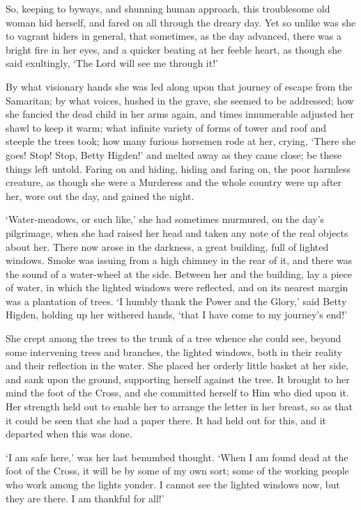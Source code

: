So, keeping to byways, and shunning human approach, this troublesome
old woman hid herself, and fared on all through the dreary day. Yet so
unlike was she to vagrant hiders in general, that sometimes, as the day
advanced, there was a bright fire in her eyes, and a quicker beating at
her feeble heart, as though she said exultingly, ‘The Lord will see me
through it!’

By what visionary hands she was led along upon that journey of escape
from the Samaritan; by what voices, hushed in the grave, she seemed
to be addressed; how she fancied the dead child in her arms again, and
times innumerable adjusted her shawl to keep it warm; what infinite
variety of forms of tower and roof and steeple the trees took; how many
furious horsemen rode at her, crying, ‘There she goes! Stop! Stop,
Betty Higden!’ and melted away as they came close; be these things left
untold. Faring on and hiding, hiding and faring on, the poor harmless
creature, as though she were a Murderess and the whole country were up
after her, wore out the day, and gained the night.

‘Water-meadows, or such like,’ she had sometimes murmured, on the day’s
pilgrimage, when she had raised her head and taken any note of the real
objects about her. There now arose in the darkness, a great building,
full of lighted windows. Smoke was issuing from a high chimney in
the rear of it, and there was the sound of a water-wheel at the side.
Between her and the building, lay a piece of water, in which the lighted
windows were reflected, and on its nearest margin was a plantation of
trees. ‘I humbly thank the Power and the Glory,’ said Betty Higden,
holding up her withered hands, ‘that I have come to my journey’s end!’

She crept among the trees to the trunk of a tree whence she could see,
beyond some intervening trees and branches, the lighted windows, both in
their reality and their reflection in the water. She placed her orderly
little basket at her side, and sank upon the ground, supporting herself
against the tree. It brought to her mind the foot of the Cross, and
she committed herself to Him who died upon it. Her strength held out to
enable her to arrange the letter in her breast, so as that it could
be seen that she had a paper there. It had held out for this, and it
departed when this was done.

‘I am safe here,’ was her last benumbed thought. ‘When I am found dead
at the foot of the Cross, it will be by some of my own sort; some of
the working people who work among the lights yonder. I cannot see the
lighted windows now, but they are there. I am thankful for all!’


